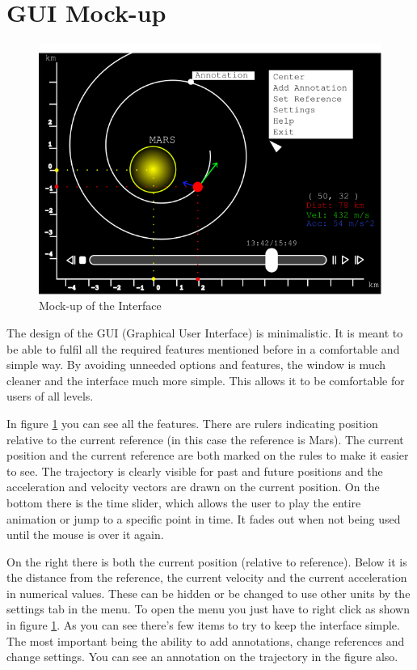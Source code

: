 \documentclass[a4paper,11pt]{article}
\begin{document}
\section{GUI Mock-up}

\begin{figure}[ht]
\centering
\includegraphics[width=1\textwidth]{mockup}
\caption{Mock-up of the Interface}
\label{fig:mockup}
\end{figure}

The design of the GUI (Graphical User Interface) is minimalistic. It is meant to be able to fulfil all the required features mentioned before in a comfortable and simple way. By avoiding unneeded options and features, the window is much cleaner and the interface much more simple. This allows it to be comfortable for users of all levels.

In figure \ref{fig:mockup} you can see all the features. There are rulers indicating position relative to the current reference (in this case the reference is Mars). The current position and the current reference are both marked on the rules to make it easier to see. The trajectory is clearly visible for past and future positions and the acceleration and velocity vectors are drawn on the current position. On the bottom there is the time slider, which allows the user to play the entire animation or jump to a specific point in time. It fades out when not being used until the mouse is over it again.

On the right there is both the current position (relative to reference). Below it is the distance from the reference, the current velocity and the current acceleration in numerical values. These can be hidden or be changed to use other units by the settings tab in the menu. To open the menu you just have to right click as shown in figure \ref{fig:mockup}. As you can see there's few items to try to keep the interface simple. The most important being the ability to add annotations, change references and change settings. You can see an annotation on the trajectory in the figure also.
\end{document}
